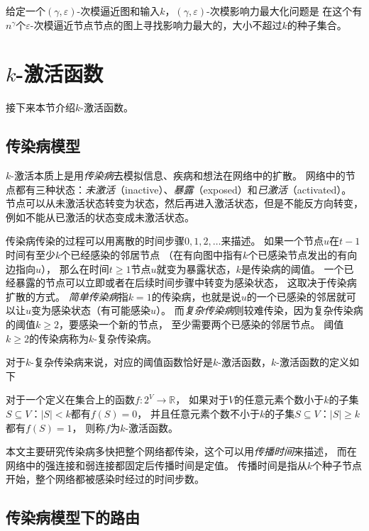 \begin{definition}
给定一个$(\gamma,\varepsilon)$-次模逼近图和输入$k$，$(\gamma,\varepsilon)$-次模影响力最大化问题是
在这个有$n^{\gamma}$个$\varepsilon$-次模逼近节点节点的图上寻找影响力最大的，大小不超过$k$的种子集合。
\end{definition}


\section{$k$-激活函数}
接下来本节介绍$k$-激活函数。

\subsection{传染病模型}
$k$-激活本质上是用{\it 传染病}去模拟信息、疾病和想法在网络中的扩散。
网络中的节点都有三种状态：{\it 未激活}（inactive）、{\it 暴露}（exposed）和{\it 已激活}（activated）。
节点可以从未激活状态转变为状态，然后再进入激活状态，但是不能反方向转变，例如不能从已激活的状态变成未激活状态。

传染病传染的过程可以用离散的时间步骤$0,1,2,\ldots$来描述。
如果一个节点$u$在$t-1$时间有至少$k$个已经感染的邻居节点
（在有向图中指有$k$个已感染节点发出的有向边指向$u$），
那么在时间$t\ge 1$节点$u$就变为暴露状态，$k$是传染病的阈值。
一个已经暴露的节点可以立即或者在后续时间步骤中转变为感染状态，
这取决于传染病扩散的方式。
{\it 简单传染病}指$k=1$的传染病，也就是说$u$的一个已感染的邻居就可以让$u$变为感染状态（有可能感染$u$）。
而{\it 复杂传染病}则较难传染，因为复杂传染病的阈值$k \geq 2$，要感染一个新的节点，
至少需要两个已感染的邻居节点。
阈值$k\ge 2$的传染病称为$k$-复杂传染病。

对于$k$-复杂传染病来说，对应的阈值函数恰好是$k$-激活函数，$k$-激活函数的定义如下
\begin{definition}[$k$-激活]
对于一个定义在集合上的函数$f:2^V \to \mathbb{R}$，
如果对于$V$的任意元素个数小于$k$的子集$S \subseteq V：|S|<k$都有$f(S) = 0$，
并且任意元素个数不小于$k$的子集$S \subseteq V：|S|\geq k$都有$f(S) = 1$，
则称$f$为$k$-激活函数。
\end{definition}


本文主要研究传染病多快把整个网络都传染，这个可以用{\it 传播时间}来描述，
而在网络中的强连接和弱连接都固定后传播时间是定值。
传播时间是指从$k$个种子节点开始，整个网络都被感染时经过的时间步数。

\subsection{传染病模型下的路由}


